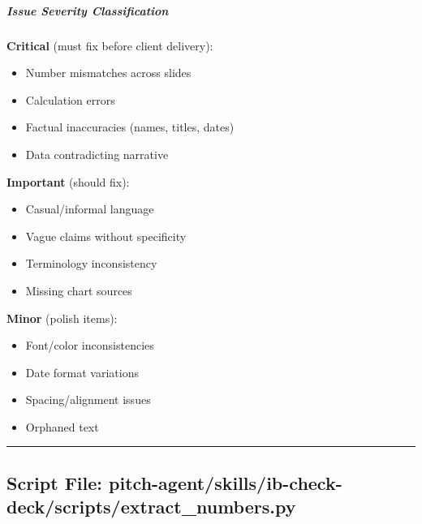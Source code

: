 \documentclass[11pt]{article}
\begin{document}
\subparagraph{Issue Severity Classification}\mbox{}\par

\textbf{Critical} (must fix before client delivery):

\begin{itemize}[leftmargin=*,itemsep=2pt,topsep=2pt]
\item {} Number mismatches across slides
\item {} Calculation errors
\item {} Factual inaccuracies (names, titles, dates)
\item {} Data contradicting narrative
\end{itemize}

\textbf{Important} (should fix):

\begin{itemize}[leftmargin=*,itemsep=2pt,topsep=2pt]
\item {} Casual/informal language
\item {} Vague claims without specificity
\item {} Terminology inconsistency
\item {} Missing chart sources
\end{itemize}

\textbf{Minor} (polish items):

\begin{itemize}[leftmargin=*,itemsep=2pt,topsep=2pt]
\item {} Font/color inconsistencies
\item {} Date format variations
\item {} Spacing/alignment issues
\item {} Orphaned text
\end{itemize}

\vspace{0.8em}\hrule\vspace{0.8em}

\subsection{Script File: pitch-agent/skills/ib-check-deck/scripts/extract\_\allowbreak{}numbers.py}\label{file:pitch-agent-skills-ib-check-deck-scripts-extract-numbers-py}
\end{document}
